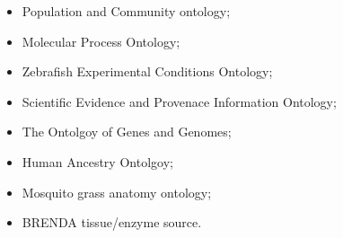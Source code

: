 \documentclass{cisfyp}
\begin{document}
\begin{appendices}
\begin{multicols}{2}
\begin{itemize}
	\item Population and Community ontology; \item Molecular Process Ontology; \item Zebrafish Experimental Conditions Ontology; \item Scientific Evidence and Provenace Information Ontology; \item The Ontolgoy of Genes and Genomes; \item Human Ancestry Ontolgoy; \item Mosquito grass anatomy ontology; 
	\item BRENDA tissue/enzyme source.
\end{itemize}
\end{multicols}
\end{appendices}
\nocite{*}


\end{document}
